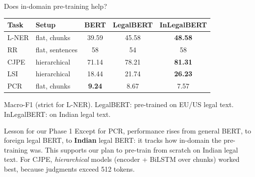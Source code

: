 \documentclass[aspectratio=169,11pt]{beamer}
\begin{document}
\begin{frame}{Does in-domain pre-training help?}
  \centering
  \footnotesize
  \begin{tabular}{@{}llccc@{}}
    \toprule
    Task & Setup & BERT & LegalBERT & InLegalBERT\\
    \midrule
    L-NER & flat, chunks & 39.59 & 45.58 & \textbf{48.58}\\
    RR & flat, sentences & 58 & 54 & 58\\
    CJPE & hierarchical & 71.14 & 78.21 & \textbf{81.31}\\
    LSI & hierarchical & 18.44 & 21.74 & \textbf{26.23}\\
    PCR & flat, chunks & \textbf{9.24} & 8.67 & 7.57\\
    \bottomrule
  \end{tabular}
  \vspace{1mm}

  {\scriptsize Macro-F1 (strict for L-NER). LegalBERT: pre-trained on EU/US legal text. InLegalBERT: on Indian legal text.}
  \vspace{2mm}

  \raggedright
  \begin{exampleblock}{Lesson for our Phase 1}
    \small
    Except for PCR, performance rises from general BERT, to foreign legal BERT, to \textbf{Indian} legal BERT: it tracks how in-domain the pre-training was.
    This supports our plan to pre-train from scratch on Indian legal text. For CJPE, \emph{hierarchical} models (encoder + BiLSTM over chunks) worked best, because judgments exceed 512 tokens.
  \end{exampleblock}
\end{frame}
\end{document}
